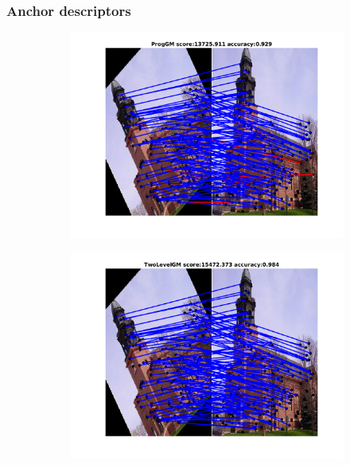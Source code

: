 \documentclass[
	fontsize=12pt,
	paper=a4,
	twoside=false,
	numbers=noenddot,
	plainheadsepline,
	toc=listof,
	toc=bibliography
]{scrartcl}
\begin{document}
\subsubsection{Anchor descriptors}
\begin{figure}[h] 
	
	\begin{subfigure}[b]{0.33\textwidth}
		\centering
		\includegraphics[scale=0.25]{"fig_ver2608/RealImages/ImgTrafo/anchor_descr/using_cpd_afftrafo/fi_1_ProgGM"} 
	\end{subfigure}%
	\begin{subfigure}[b]{0.33\textwidth}
		\centering
		\includegraphics[scale=0.25]{"fig_ver2608/RealImages/ImgTrafo/anchor_descr/using_cpd_afftrafo/fi_1_TwoLevelGM"} 

\end{subfigure}
\end{figure}
\end{document}
